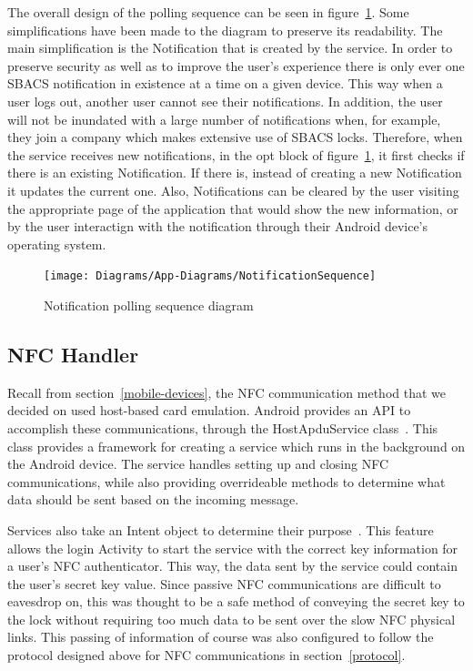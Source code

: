 \documentclass[12pt]{report}
\let\Oldsubsection\subsection
\renewcommand{\subsection}{\FloatBarrier\Oldsubsection}
\begin{document}
The overall design of the polling sequence can be seen in figure~\ref{fig:notfication-sequence}. Some simplifications
have been made to the diagram to preserve its readability. The main simplification is the Notification that is created
by the service. In order to preserve security as well as to improve the user's experience there is only ever one SBACS
notification in existence at a time on a given device. This way when a user logs out, another user cannot see their
notifications. In addition, the user will not be inundated with a large number of notifications when, for example, they
join a company which makes extensive use of SBACS locks. Therefore, when the service receives new notifications, in the
opt block of figure~\ref{fig:notfication-sequence}, it first checks if there is an existing Notification. If there is,
instead of creating a new Notification it updates the current one. Also, Notifications can be cleared by the user
visiting the appropriate page of the application that would show the new information, or by the user interactign with
the notification through their Android device's operating system.

\begin{figure}
    \centering
    \texttt{[image: Diagrams/App-Diagrams/NotificationSequence]}
    \caption{Notification polling sequence diagram}
    \label{fig:notfication-sequence}
\end{figure}


\subsection{NFC Handler} \label{nfc-handler}

Recall from section~\ref{mobile-devices}, the NFC communication method that we decided on used host-based card emulation. Android provides
an API to accomplish these communications, through the HostApduService class~\autocite{ANDROIDAPDU}. This class provides a framework for
creating a service which runs in the background on the Android device. The service handles setting up and closing NFC
communications, while also providing overrideable methods to determine what data should be sent based on the incoming
message.

Services also take an Intent object to determine their purpose~\autocite{ANDROIDINTENT}. This feature allows the login Activity to start
the service with the correct key information for a user's NFC authenticator. This way, the data sent by the service could
contain the user's secret key value. Since passive NFC communications are difficult to eavesdrop on, this was thought to be
a safe method of conveying the secret key to the lock without requiring too much data to be sent over the slow NFC
physical links. This passing of information of course was also configured to follow the protocol designed above for NFC
communications in section~\ref{protocol}.
\end{document}
